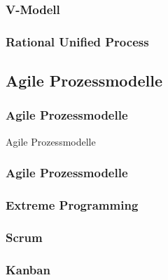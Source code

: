 \begin{frame}
\frametitle{V-Modell}
	
\end{frame}

\begin{frame}
\frametitle{Rational Unified Process}
	
\end{frame}

\subsection{Agile Prozessmodelle}
\begin{frame}
\frametitle{Agile Prozessmodelle}
\huge Agile Prozessmodelle
\end{frame}

\begin{frame}
\frametitle{Agile Prozessmodelle}

\end{frame}

\begin{frame}
\frametitle{Extreme Programming}
	
\end{frame}

\begin{frame}
\frametitle{Scrum}
	
\end{frame}

\begin{frame}
\frametitle{Kanban}
	
\end{frame}
